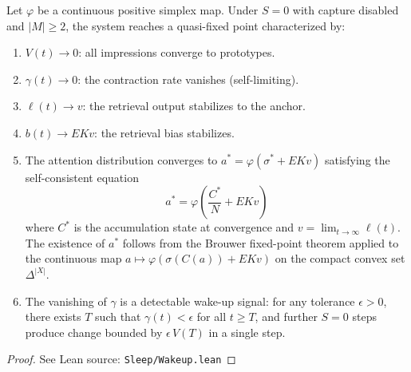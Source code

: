 \begin{theorem}[Quasi-fixed-point under $S = 0$; $\mathcal{A}_+$]
\label{thm:wakeup}
\leanok
{}
Let $\varphi$ be a continuous positive simplex map.  Under $S = 0$ with capture disabled and $|M| \geq 2$, the system reaches a quasi-fixed point characterized by:
\begin{enumerate}
\item $V(t) \to 0$: all impressions converge to prototypes.
\item $\gamma(t) \to 0$: the contraction rate vanishes (self-limiting).
\item $\ell(t) \to v$: the retrieval output stabilizes to the anchor.
\item $b(t) \to EKv$: the retrieval bias stabilizes.
\item The attention distribution converges to $a^* = \varphi(\sigma^* + EKv)$ satisfying the self-consistent equation
\[
a^* = \varphi\!\left(\frac{C^*}{N} + EKv\right)
\]
where $C^*$ is the accumulation state at convergence and $v = \lim_{t \to \infty} \ell(t)$.  The existence of $a^*$ follows from the Brouwer fixed-point theorem applied to the continuous map $a \mapsto \varphi(\sigma(C(a)) + EKv)$ on the compact convex set $\Delta^{|X|}$.
\item The vanishing of $\gamma$ is a detectable wake-up signal: for any tolerance $\epsilon > 0$, there exists $T$ such that $\gamma(t) < \epsilon$ for all $t \geq T$, and further $S = 0$ steps produce change bounded by $\epsilon\,V(T)$ in a single step.
\end{enumerate}
\end{theorem}

\begin{proof}
\leanok
{}
See Lean source: \texttt{Sleep/Wakeup.lean}
\end{proof}

